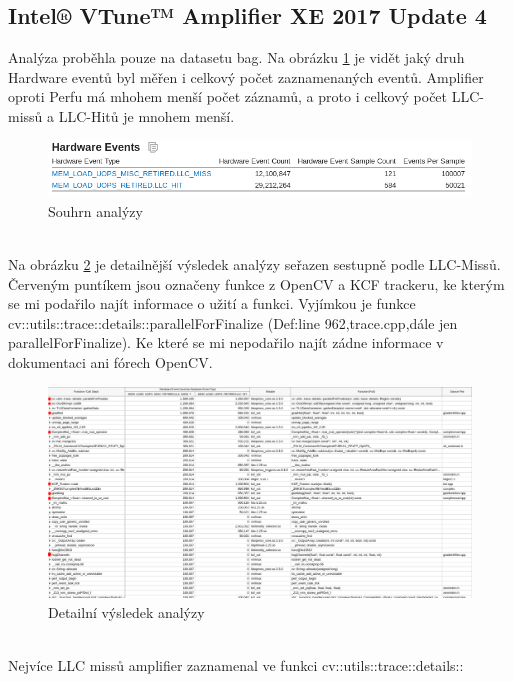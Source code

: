 \documentclass{article}
\begin{document}
\subsection{Intel® VTune™ Amplifier XE 2017 Update 4}
Analýza proběhla pouze na datasetu bag. Na obrázku \ref{Amp-summary} je vidět jaký druh Hardware eventů byl měřen i celkový počet zaznamenaných eventů. Amplifier oproti Perfu má mhohem menší počet záznamů, a proto i celkový počet LLC-missů a LLC-Hitů je mnohem menší.
\begin{figure}[h!]
	\centering
	\includegraphics[width=\linewidth]{Amplifier/Bag/Summary-bag.png}
	\caption{Souhrn analýzy}
	\label{Amp-summary}
\end{figure}
\\
Na obrázku \ref{Amp-detail} je detailnější výsledek analýzy seřazen sestupně podle LLC-Missů. Červeným puntíkem jsou označeny funkce z OpenCV a KCF trackeru, ke kterým se mi podařilo najít informace o užití a funkci. Vyjímkou je funkce cv::utils::trace::details::parallelForFinalize (Def:line 962,trace.cpp,dále jen parallelForFinalize). Ke které se mi nepodařilo najít zádne informace v dokumentaci ani fórech OpenCV.
\begin{figure}[h!]
	\centering
	\includegraphics[width=\linewidth]{Amplifier/Bag/Detail-bag-gimp.png}
	\caption{Detailní výsledek analýzy}
	\label{Amp-detail}
\end{figure}
\\
Nejvíce LLC missů amplifier zaznamenal ve funkci cv::utils::trace::details::
\end{document}
